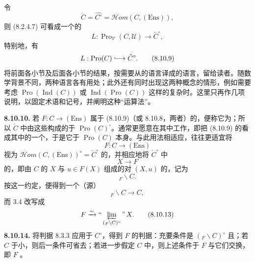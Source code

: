令
\[
\check C=\widehat{C^\circ}
=\mathscr{H}\!om(C,(\mathrm{Ens})),\tag{8.10.7}
\]
则 (8.2.4.7) 可看成一个的
\[
L:\operatorname{Pro}_{\mathcal V}(C,\mathcal U)\longrightarrow\check C^\circ,
\tag{8.10.8}
\]
特别地，有
\[
L:\operatorname{Pro}(C)\lhook\joinrel\longrightarrow\check C^\circ.
\tag{8.10.9}
\]
将前面各小节及后面各小节的结果，按需要从的语言译成的语言，留给读者。随数学背景不同，两种语言各有用处；此外还有同时出现这两种概念的情形，例如需要考虑 $\operatorname{Pro}(\operatorname{Ind}(C))$ 或 $\operatorname{Ind}(\operatorname{Pro}(C))$ 这样的复杂时。这里只再作几项说明，以固定术语和记号，并阐明这种“运算法”。

\textbf{8.10.10.} 若 $F:C\to(\mathrm{Ens})$ 属于 (8.10.9)（或 8.10.8，两者）的，便称它为；所以 $\check C$ 中由这些构成的于 $\operatorname{Pro}(C)^\circ$。通常更愿意在其中工作，即把 (8.10.9) 的看成其中的一个，于是它于 $\operatorname{Pro}(C)$ 本身。与此用法相适应，往往更适宜将
\[
F:C\longrightarrow(\mathrm{Ens})
\]
视为 $\mathscr{H}\!om(C,(\mathrm{Ens}))^\circ=\check C^\circ$ 的，并相应地将 $\check C^\circ$ 中
\[
X\longrightarrow F
\]
的，即由 $C$ 的 $X$ 与 $u\in F(X)$ 组成的对 $(X,u)$ 的，记为
\[
{}_F\backslash C.\tag{8.10.11}
\]
按这一约定，便得到一个（源）
\[
{}_F\backslash C\longrightarrow C,\tag{8.10.12}
\]
而 3.4 改写成
\[
F\xrightarrow{\sim}\text{“}\varprojlim_{({}_F\backslash C)^\circ}\text{”}\,X.
\tag{8.10.13}
\]
\textbf{8.10.14.} 将判据 8.3.3 应用于 $C^\circ$，得到 $F$ 的判据：充要条件是 $({}_F\backslash C)^\circ$ 且；若 $C$ 于小，则后一条件可省去；若进一步假定 $C$ 中，则上述条件于 $F$ 与它们交换，即 $F$ 。

